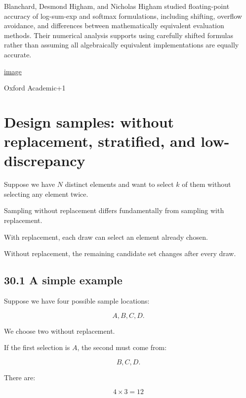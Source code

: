 \hypertarget{02-foundations-ii-ch031-research-grounding}{}

Blanchard, Desmond Higham, and Nicholas Higham studied floating-point accuracy of log-sum-exp and softmax formulations, including shifting, overflow avoidance, and differences between mathematically equivalent evaluation methods. Their numerical analysis supports using carefully shifted formulas rather than assuming all algebraically equivalent implementations are equally accurate. 

\href{https://www.google.com/s2/favicons?domain=https://academic.oup.com&sz=32}{image}

Oxford Academic+1

\section{Design samples: without replacement, stratified, and low-discrepancy}\label{02-foundations-ii-ch031-design-samples-without-replacement-stratified-and-low-discrepancy}

\hypertarget{02-foundations-ii-ch031-design-samples-without-replacement-stratified-and-low-discrepancy}{}

Suppose we have \(N\) distinct elements and want to select \(k\) of them without selecting any element twice.

Sampling without replacement differs fundamentally from sampling with replacement.

With replacement, each draw can select an element already chosen.

Without replacement, the remaining candidate set changes after every draw.

\subsection{30.1 A simple example}\label{02-foundations-ii-ch031-a-simple-example}

\hypertarget{02-foundations-ii-ch031-a-simple-example}{}

Suppose we have four possible sample locations:

\[ A,B,C,D. \]

We choose two without replacement.

If the first selection is \(A\), the second must come from:

\[ B,C,D. \]

There are:

\[ 4\times3=12 \]

